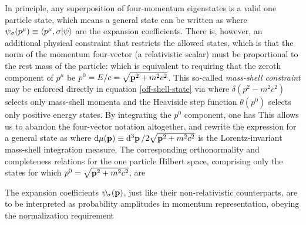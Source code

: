 \documentclass[12pt,a4paper,notitlepage]{report}
\begin{document}
In principle, any superposition of four-momentum eigenstates is a valid one particle state, which means a general state can be written as
%
%
where $\psi_\sigma(p^\mu) \equiv \bra{p^\mu,\sigma}\ket{\psi}$ are the expansion coefficients. There is, however, an additional physical constraint that restricts the allowed states, which is that the norm of the momentum four-vector (a relativistic scalar) must be proportional to the rest mass of the particle:
%
%
which is equivalent to requiring that the zeroth component of $p^\mu$ be $p^0 = E/c = \sqrt{\vb{p}^2+m^2c^2}$.
This so-called {\it mass-shell constraint} may be enforced directly in equation \eqref{off-shell-state} via
%
%
where $\delta(p^2 - m^2c^2)$ selects only mass-shell momenta and the Heaviside step function $\theta(p^0)$ selects only positive energy states. By integrating the $p^0$ component, one has
%
%
This allows us to abandon the four-vector notation altogether, and rewrite the expression for a general state as
%
%
where $\dd{\mu(\vb{p})} \equiv \dd[3]{\vb{p}}/2 \sqrt{\vb{p}^2 + m^2c^2}$ is the Lorentz-invariant mass-shell integration measure.
The corresponding orthonormality and completeness relations for the one particle Hilbert space, comprising only the states for which $p^0 = \sqrt{\vb{p}^2 + m^2c^2}$, are

%
The expansion coefficients $\psi_\sigma(\vb{p})$, just like their non-relativistic counterparts, are to be interpreted as probability amplitudes in momentum representation, obeying the normalization requirement
%
%
\end{document}
